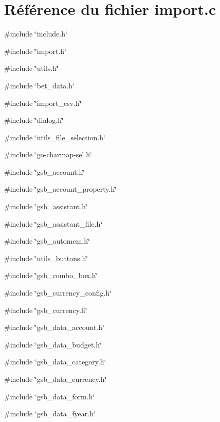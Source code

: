 \section{Référence du fichier import.c}
\label{import_8c}
{\ttfamily \#include \char`\"{}include.h\char`\"{}}\par
{\ttfamily \#include \char`\"{}import.h\char`\"{}}\par
{\ttfamily \#include \char`\"{}utils.h\char`\"{}}\par
{\ttfamily \#include \char`\"{}bet\_\-data.h\char`\"{}}\par
{\ttfamily \#include \char`\"{}import\_\-csv.h\char`\"{}}\par
{\ttfamily \#include \char`\"{}dialog.h\char`\"{}}\par
{\ttfamily \#include \char`\"{}utils\_\-file\_\-selection.h\char`\"{}}\par
{\ttfamily \#include \char`\"{}go-\/charmap-\/sel.h\char`\"{}}\par
{\ttfamily \#include \char`\"{}gsb\_\-account.h\char`\"{}}\par
{\ttfamily \#include \char`\"{}gsb\_\-account\_\-property.h\char`\"{}}\par
{\ttfamily \#include \char`\"{}gsb\_\-assistant.h\char`\"{}}\par
{\ttfamily \#include \char`\"{}gsb\_\-assistant\_\-file.h\char`\"{}}\par
{\ttfamily \#include \char`\"{}gsb\_\-automem.h\char`\"{}}\par
{\ttfamily \#include \char`\"{}utils\_\-buttons.h\char`\"{}}\par
{\ttfamily \#include \char`\"{}gsb\_\-combo\_\-box.h\char`\"{}}\par
{\ttfamily \#include \char`\"{}gsb\_\-currency\_\-config.h\char`\"{}}\par
{\ttfamily \#include \char`\"{}gsb\_\-currency.h\char`\"{}}\par
{\ttfamily \#include \char`\"{}gsb\_\-data\_\-account.h\char`\"{}}\par
{\ttfamily \#include \char`\"{}gsb\_\-data\_\-budget.h\char`\"{}}\par
{\ttfamily \#include \char`\"{}gsb\_\-data\_\-category.h\char`\"{}}\par
{\ttfamily \#include \char`\"{}gsb\_\-data\_\-currency.h\char`\"{}}\par
{\ttfamily \#include \char`\"{}gsb\_\-data\_\-form.h\char`\"{}}\par
{\ttfamily \#include \char`\"{}gsb\_\-data\_\-fyear.h\char`\"{}}\par
